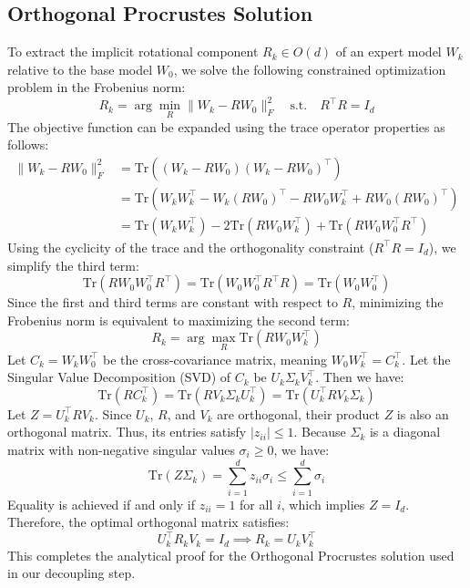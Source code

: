 \documentclass{article}
\theoremstyle{plain}
\theoremstyle{definition}
\theoremstyle{remark}
\begin{document}
\subsection{Orthogonal Procrustes Solution}
To extract the implicit rotational component $R_k \in O(d)$ of an expert model $W_k$ relative to the base model $W_0$, we solve the following constrained optimization problem in the Frobenius norm:
\begin{equation}
R_k = \arg\min_{R} \|W_k - R W_0\|_F^2 \quad \text{s.t.} \quad R^\top R = I_d
\end{equation}
The objective function can be expanded using the trace operator properties as follows:
\begin{align}
\|W_k - R W_0\|_F^2 &= \text{Tr}\left((W_k - R W_0)(W_k - R W_0)^\top\right) \nonumber \\
&= \text{Tr}\left(W_k W_k^\top - W_k (R W_0)^\top - R W_0 W_k^\top + R W_0 (R W_0)^\top\right) \nonumber \\
&= \text{Tr}\left(W_k W_k^\top\right) - 2\text{Tr}\left(R W_0 W_k^\top\right) + \text{Tr}\left(R W_0 W_0^\top R^\top\right)
\end{align}
Using the cyclicity of the trace and the orthogonality constraint ($R^\top R = I_d$), we simplify the third term:
\begin{equation}
\text{Tr}\left(R W_0 W_0^\top R^\top\right) = \text{Tr}\left(W_0 W_0^\top R^\top R\right) = \text{Tr}\left(W_0 W_0^\top\right)
\end{equation}
Since the first and third terms are constant with respect to $R$, minimizing the Frobenius norm is equivalent to maximizing the second term:
\begin{equation}
R_k = \arg\max_R \text{Tr}\left(R W_0 W_k^\top\right)
\end{equation}
Let $C_k = W_k W_0^\top$ be the cross-covariance matrix, meaning $W_0 W_k^\top = C_k^\top$. Let the Singular Value Decomposition (SVD) of $C_k$ be $U_k \Sigma_k V_k^\top$. Then we have:
\begin{equation}
\text{Tr}\left(R C_k^\top\right) = \text{Tr}\left(R V_k \Sigma_k U_k^\top\right) = \text{Tr}\left(U_k^\top R V_k \Sigma_k\right)
\end{equation}
Let $Z = U_k^\top R V_k$. Since $U_k$, $R$, and $V_k$ are orthogonal, their product $Z$ is also an orthogonal matrix. Thus, its entries satisfy $|z_{ii}| \le 1$. Because $\Sigma_k$ is a diagonal matrix with non-negative singular values $\sigma_i \ge 0$, we have:
\begin{equation}
\text{Tr}\left(Z \Sigma_k\right) = \sum_{i=1}^d z_{ii} \sigma_i \le \sum_{i=1}^d \sigma_i
\end{equation}
Equality is achieved if and only if $z_{ii} = 1$ for all $i$, which implies $Z = I_d$. Therefore, the optimal orthogonal matrix satisfies:
\begin{equation}
U_k^\top R_k V_k = I_d \implies R_k = U_k V_k^\top
\end{equation}
This completes the analytical proof for the Orthogonal Procrustes solution used in our decoupling step.
\end{document}
